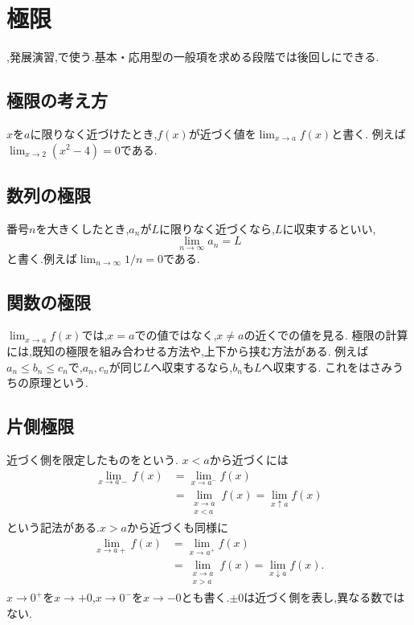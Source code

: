 
\section{極限}\label{節：極限}
  ,発展演習,で使う.基本・応用型の一般項を求める段階では後回しにできる.

  \subsection{極限の考え方}\label{節：極限：極限}
    $x$を$a$に限りなく近づけたとき,$f(x)$が近づく値を$\lim_{x\to a}f(x)$と書く.
    例えば$\lim_{x\to2}(x^2-4)=0$である.

  \subsection{数列の極限}\label{節：数列の極限}
    番号$n$を大きくしたとき,$a_n$が$L$に限りなく近づくなら,$L$に収束するといい,
    \[
      \lim_{n\to\infty}a_n=L
    \]
    と書く.例えば$\lim_{n\to\infty}1/n=0$である.

  \subsection{関数の極限}\label{節：関数の極限}
    $\lim_{x\to a}f(x)$では,$x=a$での値ではなく,$x\ne a$の近くでの値を見る.
    極限の計算には,既知の極限を組み合わせる方法や,上下から挟む方法がある.
    例えば$a_n\le b_n\le c_n$で,$a_n,c_n$が同じ$L$へ収束するなら,$b_n$も$L$へ収束する.
    これをはさみうちの原理という.

  \subsection{片側極限}\label{節：片側極限}
    近づく側を限定したものを\textbf{}という.
    $x<a$から近づく\textbf{}には
    \[
      \begin{aligned}
        \lim_{x\to a-}f(x)&=\lim_{x\to a^-}f(x)\\
        &=\lim_{\substack{x\to a\\x<a}}f(x)=\lim_{x\uparrow a}f(x)
      \end{aligned}
    \]
    という記法がある.$x>a$から近づく\textbf{}も同様に
    \[
      \begin{aligned}
        \lim_{x\to a+}f(x)&=\lim_{x\to a^+}f(x)\\
        &=\lim_{\substack{x\to a\\x>a}}f(x)=\lim_{x\downarrow a}f(x).
      \end{aligned}
    \]
    $x\to0^+$を$x\to+0$,$x\to0^-$を$x\to-0$とも書く.$\pm0$は近づく側を表し,異なる数ではない.

